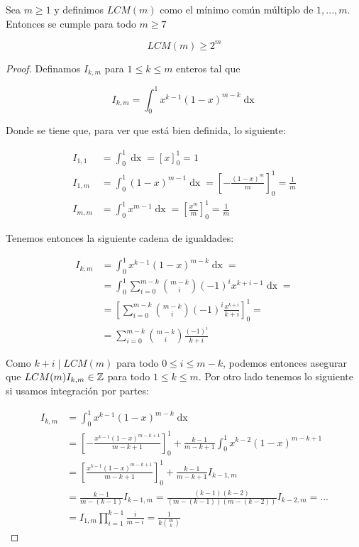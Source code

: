 \begin{lema}\label{desigualdad_LCM}
	Sea $m \geq 1$ y definimos $LCM(m)$ como el mínimo común múltiplo de $1,...,m$. Entonces se cumple para todo $m \geq 7$
	
	\begin{equation}
		LCM(m) \geq 2^m
	\end{equation}
\end{lema}

\begin{proof}
	Definamos $I_{k,m}$ para $1 \leq k \leq m$ enteros tal que
	
	\begin{equation}
	I_{k,m} = \int_{0}^{1}x^{k-1}(1-x)^{m-k}\mathop{dx}
	\end{equation}
	
	Donde se tiene que, para ver que está bien definida, lo siguiente:
	
	\begin{align}
	I_{1,1} &= \int_{0}^{1}\mathop{dx} = \left[x\right]_0^1 = 1\\
	I_{1,m} &= \int_{0}^{1}(1-x)^{m-1}\mathop{dx} = \left[-\frac{(1-x)^m}{m}\right]_0^1 = \frac{1}{m}\\
	I_{m,m} &= \int_{0}^{1}x^{m-1}\mathop{dx} = \left[\frac{x^m}{m}\right]_0^1 = \frac{1}{m}
	\end{align}
	
	Tenemos entonces la siguiente cadena de igualdades:
	
	\begin{align}
	I_{k,m} &= \int_{0}^{1}x^{k-1}(1-x)^{m-k}\mathop{dx} =\\
	&= \int_{0}^{1}\sum_{i=0}^{m-k}\binom{m-k}{i}(-1)^ix^{k+i-1}\mathop{dx} =\\
	&= \left[\sum_{i=0}^{m-k}\binom{m-k}{i}(-1)^i\frac{x^{k+i}}{k+i}\right]_0^1 =\\
	&= \sum_{i=0}^{m-k}\binom{m-k}{i}\frac{(-1)^i}{k+i}
	\end{align}
	
	Como $k+i \mid LCM(m)$ para todo $0 \leq i \leq m-k$, podemos entonces asegurar que $LCM(m)I_{k,m} \in \mathbb{Z}$ para todo $1 \leq k \leq m$. Por otro lado tenemos lo siguiente si usamos integración por partes:
	
	\begin{align}
	I_{k,m} &= \int_{0}^{1}x^{k-1}(1-x)^{m-k}\mathop{dx}\\
	&= \left[-\frac{x^{k-1}(1-x)^{m-k+1}}{m-k+1}\right]_0^1 + \frac{k-1}{m-k+1}\int_{0}^{1}x^{k-2}(1-x)^{m-k+1}\\
	&= \left[\frac{x^{k-1}(1-x)^{m-k+1}}{m-k+1}\right]_0^1 + \frac{k-1}{m-k+1}I_{k-1,m}\\
	&= \frac{k-1}{m-(k-1)}I_{k-1,m} = \frac{(k-1)(k-2)}{(m-(k-1))(m-(k-2))}I_{k-2,m} =...\\
	&= I_{1,m}\prod_{i=1}^{k-1}\frac{i}{m-i} = \frac{1}{k\displaystyle\binom{m}{k}}
	\end{align}
	

\end{proof}
